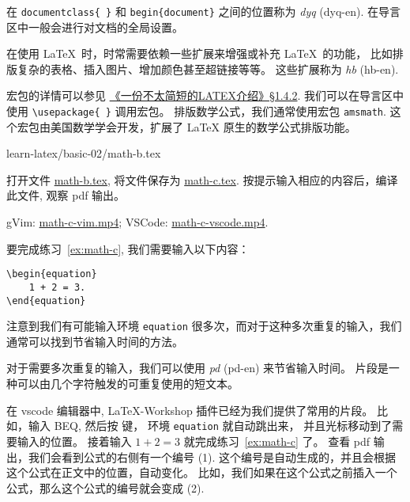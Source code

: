 \documentclass[
    11pt,
    base=hide,
    cite=authoryear,
    device=phone,
    lang=cn,
    mode=simple,
    result=answer,
    toc=onecol,
]{elegantsierxue310}
\begin{document}
\begin{latex}\label{tex:preamble}
    在 \lstinline|documentclass{ }| 和
    \lstinline|begin{document}| 之间的位置称为
    \emph{\gls{dyq}} (\gls{dyq-en}).
    在导言区中一般会进行对文档的全局设置。
\end{latex}
\begin{latex}\label{tex:package}
    在使用 \LaTeX\ 时，时常需要依赖一些扩展来增强或补充 \LaTeX\ 的功能，
    比如排版复杂的表格、插入图片、增加颜色甚至超链接等等。
    这些扩展称为
    \emph{\gls{hb}} (\gls{hb-en}).
\end{latex}
宏包的详情可以参见 \hyperlink{books/lshort-zh-cn.pdf.18}%
{《一份不太简短的LATEX介绍》\S1.4.2}.
我们可以在导言区中使用 \lstinline|\usepackage{ }| 调用宏包。
排版数学公式，我们通常使用宏包 \texttt{amsmath}.
这个宏包由美国数学学会开发，扩展了 {\LaTeX} 原生的数学公式排版功能。

%
{learn-latex/basic-02/math-b.tex}
\begin{exercise}\label{ex:math-c}
    打开文件
    \href{learn-latex/basic-02/math-b.tex}{math-b.tex},
    将文件保存为
    \href{learn-latex/basic-02/math-c.tex}{math-c.tex}.
    按提示输入相应的内容后，编译此文件, 观察 pdf 输出。
\end{exercise}
\begin{cast}\label{cast:math-c}
    gVim: \href{media/casts/math-c-vim.mp4}{math-c-vim.mp4};
    VSCode: \href{media/casts/math-c-vscode.mp4}{math-c-vscode.mp4}.
\end{cast}
要完成练习~\ref{ex:math-c}, 我们需要输入以下内容：
\begin{lstlisting}[style=lst]
\begin{equation}
    1 + 2 = 3.
\end{equation}
\end{lstlisting}
注意到我们有可能输入环境 \texttt{equation}
很多次，而对于这种多次重复的输入，我们通常可以找到节省输入时间的方法。
\begin{share}\label{share:snippets}
    对于需要多次重复的输入，我们可以使用
    \emph{\gls{pd}} (\gls{pd-en}) 来节省输入时间。
    片段是一种可以由几个字符触发的可重复使用的短文本。
\end{share}
在 vscode 编辑器中, LaTeX-Workshop 插件已经为我们提供了常用的片段。
比如，输入 BEQ, 然后按  键，
环境 \texttt{equation} 就自动跳出来，
并且光标移动到了需要输入的位置。
接着输入 \(1 + 2 = 3\) 就完成练习~\ref{ex:math-c} 了。
查看 pdf 输出，我们会看到公式的右侧有一个编号 (1).
这个编号是自动生成的，并且会根据这个公式在正文中的位置，自动变化。
比如，我们如果在这个公式之前插入一个公式，那么这个公式的编号就会变成 (2).
\end{document}

